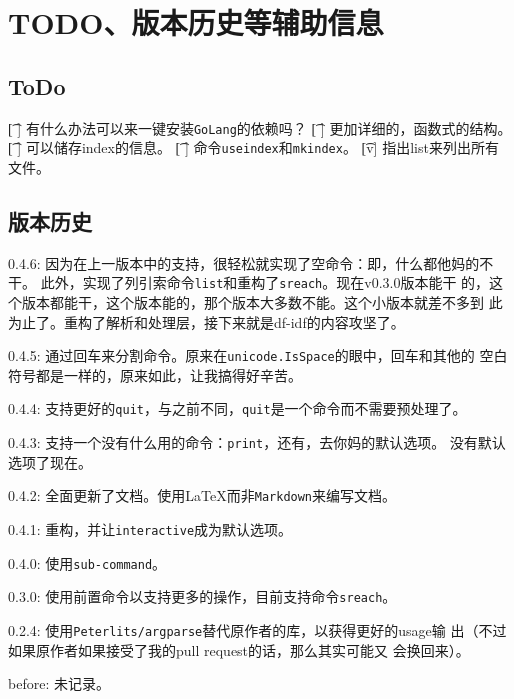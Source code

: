 \section{TODO、版本历史等辅助信息}

\subsection{ToDo}
\begin{plttodoenv}{1}
    \t[ ] 有什么办法可以来一键安装\verb|GoLang|的依赖吗？
    \t[ ] 更加详细的，函数式的结构。
    \t[ ] 可以储存index的信息。
    \t[ ] 命令\verb|useindex|和\verb|mkindex|。
    \t[v] 指出list来列出所有文件。
\end{plttodoenv}
\bigskip

\subsection{版本历史}

\hline

0.4.6: 因为在上一版本中的支持，很轻松就实现了空命令：即，什么都他妈的不干。
此外，实现了列引索命令\verb|list|和重构了\verb|sreach|。现在v0.3.0版本能干
的，这个版本都能干，这个版本能的，那个版本大多数不能。这个小版本就差不多到
此为止了。重构了解析和处理层，接下来就是df-idf的内容攻坚了。

0.4.5: 通过回车来分割命令。原来在\verb|unicode.IsSpace|的眼中，回车和其他的
空白符号都是一样的，原来如此，让我搞得好辛苦。

0.4.4: 支持更好的\verb|quit|，与之前不同，\verb|quit|是一个命令而不需要预处理了。

0.4.3: 支持一个没有什么用的命令：\verb|print|，还有，去你妈的默认选项。
没有默认选项了现在。

0.4.2: 全面更新了文档。使用\LaTeX{}而非\verb|Markdown|来编写文档。

0.4.1: 重构，并让\verb|interactive|成为默认选项。

0.4.0: 使用\verb|sub-command|。

\hline

0.3.0: 使用前置命令以支持更多的操作，目前支持命令\verb|sreach|。

\hline

0.2.4: 使用\verb|Peterlits/argparse|替代原作者的库，以获得更好的usage输
出（不过如果原作者如果接受了我的pull request的话，那么其实可能又
会换回来）。

\hline

before: 未记录。

